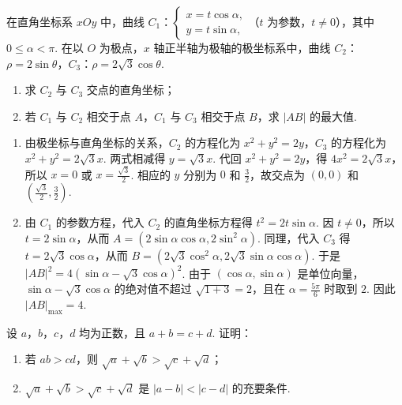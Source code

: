 \begin{problem}
在直角坐标系 \(xOy\) 中，曲线 \(C_1\)：\(\begin{cases}
x=t\cos\alpha,\\
y=t\sin\alpha,
\end{cases}\)（\(t\) 为参数，\(t\neq 0\)），其中 \(0\leqslant\alpha<\pi\). 在以 \(O\) 为极点，\(x\) 轴正半轴为极轴的极坐标系中，曲线 \(C_2\)：\(\rho=2\sin\theta\)，\(C_3\)：\(\rho=2\sqrt{3}\cos\theta\).

\begin{enumerate}
\item 求 \(C_2\) 与 \(C_3\) 交点的直角坐标；
\item 若 \(C_1\) 与 \(C_2\) 相交于点 \(A\)，\(C_1\) 与 \(C_3\) 相交于点 \(B\)，求 \(|AB|\) 的最大值.
\end{enumerate}
\end{problem}

\begin{solution}
\begin{enumerate}
\item 由极坐标与直角坐标的关系，\(C_2\) 的方程化为 \(x^2+y^2=2y\)，\(C_3\) 的方程化为 \(x^2+y^2=2\sqrt3x\). 两式相减得 \(y=\sqrt3x\). 代回 \(x^2+y^2=2y\)，得 \(4x^2=2\sqrt3x\)，所以 \(x=0\) 或 \(x=\frac{\sqrt3}{2}\). 相应的 \(y\) 分别为 \(0\) 和 \(\frac32\)，故交点为 \((0,0)\) 和 \(\left(\frac{\sqrt3}{2},\frac32\right)\).
\item 由 \(C_1\) 的参数方程，代入 \(C_2\) 的直角坐标方程得 \(t^2=2t\sin\alpha\). 因 \(t\ne0\)，所以 \(t=2\sin\alpha\)，从而 \(A=(2\sin\alpha\cos\alpha,2\sin^2\alpha)\). 同理，代入 \(C_3\) 得 \(t=2\sqrt3\cos\alpha\)，从而 \(B=(2\sqrt3\cos^2\alpha,2\sqrt3\sin\alpha\cos\alpha)\). 于是
\(|AB|^2=4(\sin\alpha-\sqrt3\cos\alpha)^2\).
由于 \((\cos\alpha,\sin\alpha)\) 是单位向量，\(\sin\alpha-\sqrt3\cos\alpha\) 的绝对值不超过 \(\sqrt{1+3}=2\)，且在 \(\alpha=\frac{5\pi}{6}\) 时取到 \(2\). 因此 \(|AB|_{\max}=4\).
\end{enumerate}
\end{solution}

\begin{problem}
设 \(a\)，\(b\)，\(c\)，\(d\) 均为正数，且 \(a+b=c+d\). 证明：

\begin{enumerate}
\item 若 \(ab>cd\)，则 \(\sqrt{a}+\sqrt{b}>\sqrt{c}+\sqrt{d}\)；
\item \(\sqrt{a}+\sqrt{b}>\sqrt{c}+\sqrt{d}\) 是 \(\left|a-b\right|<\left|c-d\right|\) 的充要条件.
\end{enumerate}
\end{problem}


